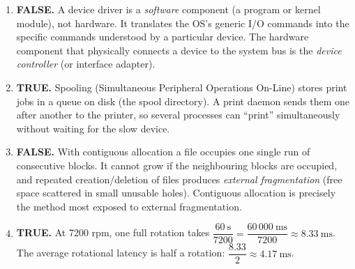 \documentclass[11pt]{article}
\newcommand{\cle}[1]{{\popxbold\color{popdark}#1}}
\begin{document}
\begin{corrige}
\begin{enumerate}
\item \textbf{FALSE.} A device driver is a \emph{software} component (a program or kernel module), not hardware. It translates the OS's generic I/O commands into the specific commands understood by a particular device. The hardware component that physically connects a device to the system bus is the \emph{device controller} (or interface adapter).
\item \textbf{TRUE.} \cle{Spooling} (Simultaneous Peripheral Operations On-Line) stores print jobs in a queue on disk (the spool directory). A print daemon sends them one after another to the printer, so several processes can ``print'' simultaneously without waiting for the slow device.
\item \textbf{FALSE.} With contiguous allocation a file occupies one single run of consecutive blocks. It cannot grow if the neighbouring blocks are occupied, and repeated creation/deletion of files produces \emph{external fragmentation} (free space scattered in small unusable holes). Contiguous allocation is precisely the method most exposed to external fragmentation.
\item \textbf{TRUE.} At 7200 rpm, one full rotation takes $\dfrac{60\ \mathrm{s}}{7200} = \dfrac{60\,000\ \mathrm{ms}}{7200} \approx 8.33\ \mathrm{ms}$. The average rotational latency is half a rotation: $\dfrac{8.33}{2} \approx 4.17\ \mathrm{ms}$.
\end{enumerate}
\end{corrige}
\end{document}
